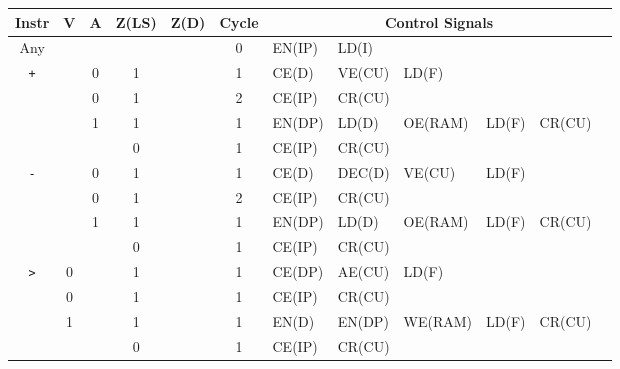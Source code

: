\begin{landscape}
  \begin{longtable}[c] {c|cccc|c|llllll}
                     Instr        & V & A & Z(LS) & Z(D) & Cycle & \multicolumn{6}{c}{Control Signals}                      \\ \hline
    \rowcolor{White} Any          &   &   &       &      & 0     & EN(IP)   & LD(I)    &         &        &        &        \\ \hline
    \rowcolor{Gray}  \texttt{+}   &   & 0 & 1     &      & 1     & CE(D)    & VE(CU)   & LD(F)   &        &        &        \\
    \rowcolor{Gray}               &   & 0 & 1     &      & 2     & CE(IP)   & CR(CU)   &         &        &        &        \\    
    \rowcolor{White}              &   & 1 & 1     &      & 1     & EN(DP)   & LD(D)    & OE(RAM) & LD(F)  & CR(CU) &        \\
    \rowcolor{Gray}               &   &   & 0     &      & 1     & CE(IP)   & CR(CU)   &         &        &        &        \\ \hline
    
    \rowcolor{White} \texttt{-}   &   & 0 & 1     &      & 1     & CE(D)    & DEC(D)   & VE(CU)  & LD(F)  &        &        \\
    \rowcolor{White}              &   & 0 & 1     &      & 2     & CE(IP)   & CR(CU)   &         &        &        &        \\
    \rowcolor{Gray}               &   & 1 & 1     &      & 1     & EN(DP)   & LD(D)    & OE(RAM) & LD(F)  & CR(CU) &        \\
    \rowcolor{White}              &   &   & 0     &      & 1     & CE(IP)   & CR(CU)   &         &        &        &        \\ \hline
    
    \rowcolor{Gray}  \texttt{>}   & 0 &   & 1     &      & 1     & CE(DP)   & AE(CU)   & LD(F)   &        &        &        \\
    \rowcolor{Gray}               & 0 &   & 1     &      & 1     & CE(IP)   & CR(CU)   &         &        &        &        \\
    \rowcolor{White}              & 1 &   & 1     &      & 1     & EN(D)    & EN(DP)   & WE(RAM) & LD(F)  & CR(CU) &        \\
    \rowcolor{Gray}               &   &   & 0     &      & 1     & CE(IP)   & CR(CU)   &         &        &        &        \\ \hline
    

\end{longtable}
\end{landscape}
